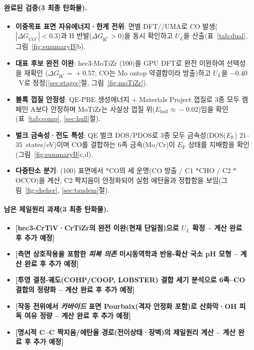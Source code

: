 \documentclass[11pt,a4paper]{report}
\newcommand{\tbc}[1]{\textcolor{blue!60!black}{\textbf{[#1 -- 계산 완료 후 추가 예정]}}}
\newcommand{\dGCO}{\Delta G_{\mathrm{CO^*}}}
\newcommand{\dGH}{\Delta G_{\mathrm{H^*}}}
\newcommand{\Ef}{E_\mathrm{F}}
\begin{document}
\paragraph{완료된 검증(3 최종 탄화물).}
\begin{itemize}[nosep]
\item \textbf{이중목표 표면 자유에너지·한계 전위}: 면별 DFT$/\!/$UMA로 CO 발생($|\dGCO|<0.3$)과
H 반발($\dGH>0$)을 동시 확인하고 $U_L$을 산출(표~\ref{tab:dual}, 그림~\ref{fig:summaryB}b).
\item \textbf{대표 후보 완전 이완}: hec3-MoTiZr (100)을 GPU DFT로 완전 이완하여 선택성을 재확인
($\dGH\!=\!+0.57$; CO는 Mo ontop 약결합이라 방출)하고 $U_L$을 $-0.40$~V로 정정(\ref{sec:stagec}절,
그림~\ref{fig:moTiZr}).
\item \textbf{볼록 껍질 안정성}: QE-PBE 생성에너지 + Materials Project 껍질로 3종 모두 캠페인 A보다
안정하며 MoTiZr는 사실상 껍질 위($E_{\mathrm{hull}}\!\approx\!-0.02$)임을 확인(표~\ref{tab:comp},
\ref{sec:hull}절).
\item \textbf{벌크 금속성·전도 특성}: QE 벌크 DOS/PDOS로 3종 모두 금속성(DOS($\Ef$)
$21$--$35$~states/eV)이며 CO를 결합하는 6족 금속(Mo/Cr)이 $\Ef$ 상태를 지배함을 확인
(그림~\ref{fig:summaryB}c,d).
\item \textbf{다중탄소 분기}: (100) 표면에서 $*$CO의 세 운명(CO 방출 / C1 $*$CHO / C2 $*$OCCO)을
계산, C2 짝지음이 안정화되어 실험 에탄올과 정합함을 보임(그림~\ref{fig:cheher}, \ref{sec:tandem}절).
\end{itemize}

\paragraph{남은 제일원리 과제(3 최종 탄화물).}
\begin{itemize}[nosep]
\item \tbc{hec3-CrTiV·CrTiZr의 완전 이완(현재 단일점)으로 $U_L$ 확정}
\item \tbc{측면 상호작용을 포함한 \emph{피복 의존} 미시동역학과 반응-확산 국소 pH 모형}
\item \tbc{투영 결정-궤도(COHP/COOP, LOBSTER) 결합 세기 분석으로 6족--CO 결합의 정량화}
\item \tbc{작동 전위에서 \emph{카바이드} 표면 Pourbaix(격자 안정화 포함)로 산화막·OH 피독 여유 정량}
\item \tbc{명시적 C--C 짝지음/에탄올 경로(전이상태·장벽)의 제일원리 계산}
\end{itemize}
\end{document}
